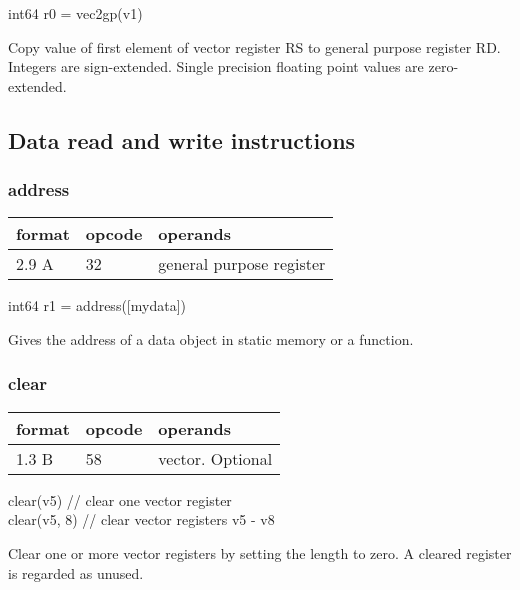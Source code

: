 \documentclass[forwardcom.tex]{subfiles}
\begin{document}
int64 r0 = vec2gp(v1)
\vspace{2mm}

Copy value of first element of vector register RS to general purpose register RD. Integers are sign-extended. Single precision floating point values are zero-extended.
\vspace{2mm}


\subsection{Data read and write instructions}


\subsubsection{address}
\label{table:addressInstruction}
\begin{tabular}{|p{12mm}|p{12mm}|p{110mm}|}
\hline
\bfseries format & \bfseries opcode & \bfseries operands \\ \hline
2.9 A & 32 & general purpose register \\ \hline
\end{tabular}
\vspace{2mm}

int64 r1 = address([mydata])
\vspace{2mm}

Gives the address of a data object in static memory or a function.
\vspace{2mm}


\subsubsection{clear}
\label{table:clearInstruction}
\begin{tabular}{|p{12mm}|p{12mm}|p{110mm}|}
\hline
\bfseries format & \bfseries opcode & \bfseries operands \\ \hline
1.3 B & 58 & vector. Optional \\ \hline
\end{tabular}
\vspace{2mm}

clear(v5)      // clear one vector register \\
clear(v5, 8)   // clear vector registers v5 - v8
\vspace{2mm}

Clear one or more vector registers by setting the length to zero. A cleared register is regarded as unused.
\vspace{2mm}
\end{document}
